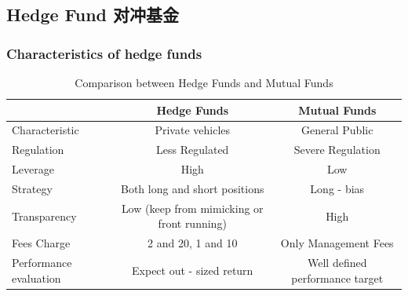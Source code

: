 




\subsection{Hedge Fund 对冲基金}


\subsubsection{Characteristics of hedge funds}
\begin{table}[h]
    \centering
    \caption{Comparison between Hedge Funds and Mutual Funds}
    \begin{tabular}{@{}lcc@{}}
        \toprule
         & Hedge Funds & Mutual Funds \\
        \midrule
        Characteristic & Private vehicles & General Public \\
        Regulation & Less Regulated & Severe Regulation \\
        Leverage & High & Low \\
        Strategy & Both long and short positions & Long - bias \\
        Transparency & Low (keep from mimicking or front running) & High \\
        Fees Charge & 2 and 20, 1 and 10 & Only Management Fees \\
        Performance evaluation & Expect out - sized return & Well defined performance target \\
        \bottomrule
    \end{tabular}
\end{table}




